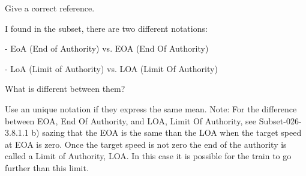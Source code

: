 \documentclass{template/openetcs_article}
\begin{document}
\resolution
Give a correct reference.

I found in the subset, there are two different notations:

- EoA (End of Authority) vs. EOA (End Of Authority)

- LoA (Limit of Authority) vs. LOA (Limit Of Authority)

What is different between them?

\resolution
Use an unique notation if they express the same mean.
Note: For the difference between EOA, End Of Authority, and LOA, Limit Of Authority, see  Subset-026-3.8.1.1 b) sazing that the EOA is the same than the LOA when the target speed at EOA is zero.
Once the target speed is not zero the end of the authority is called a Limit of Authority, LOA. In this case it is possible for the train to go further than this limit.









\end{document}
